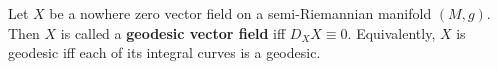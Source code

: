 Let $X$ be a nowhere zero vector field on a semi-Riemannian manifold $(M, g)$. Then $X$ is called a \textbf{geodesic vector field} iff $D_X X \equiv 0$. Equivalently, $X$ is geodesic iff each of its integral curves is a geodesic.
